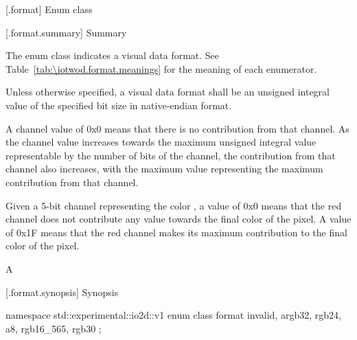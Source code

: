  [\iotwod.format] {Enum class }

 [\iotwod.format.summary] { Summary}

\pnum
The  enum class indicates a visual data format. See Table~\ref{tab:\iotwod.format.meanings} for 
the meaning of each  enumerator.

%
%
\pnum
Unless otherwise specified, a visual data format shall be an unsigned integral
value of the specified bit size in native-endian format.

%
\pnum
A channel value of 0x0 means that there is no contribution from that channel. 
As the channel value increases towards the maximum unsigned integral value 
representable by the number of bits of the channel, the contribution from that 
channel also increases, with the maximum value representing the maximum
contribution from that channel.
\begin{example}
Given a 5-bit channel representing the color , a value of 0x0 means that the red channel does not 
contribute any value towards the final color of the pixel. A value of 0x1F 
means that the red channel makes its maximum contribution to the final color of 
the pixel.

A
\end{example}

 [\iotwod.format.synopsis] { Synopsis}

\begin{codeblock}
namespace std::experimental::io2d::v1 {
  enum class format {
    invalid,
    argb32,
    rgb24,
    a8,
    rgb16_565,
    rgb30
  };
}
\end{codeblock}

